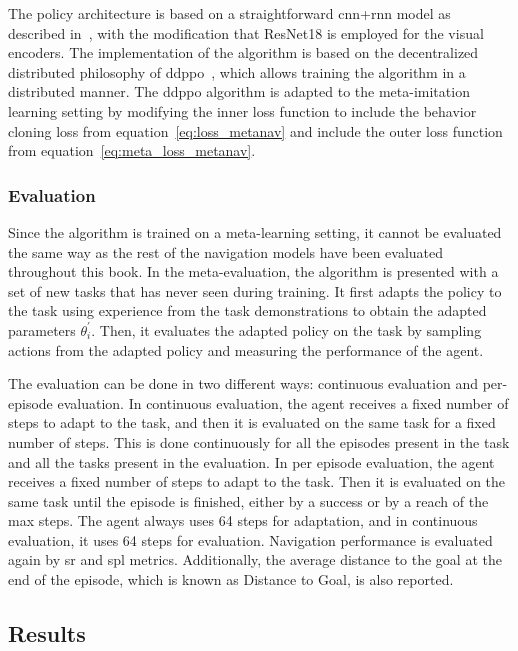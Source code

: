 The policy architecture is based on a straightforward \acrshort{cnn}+\acrshort{rnn} model as described in~\cite{ramrakhya2023}, with the modification that ResNet18 is employed for the visual encoders.
The implementation of the algorithm is based on the decentralized distributed philosophy of \acrshort{ddppo}~\cite{wijmans2020}, which allows training the algorithm in a distributed manner.
The \acrshort{ddppo} algorithm is adapted to the meta-imitation learning setting by modifying the inner loss function to include the behavior cloning loss from equation~\ref{eq:loss_metanav} and include the outer loss function from equation~\ref{eq:meta_loss_metanav}.

\subsubsection{Evaluation}\label{subsubsec:evaluation_metanav}

Since the algorithm is trained on a meta-learning setting, it cannot be evaluated the same way as the rest of the navigation models have been evaluated throughout this book.
In the meta-evaluation, the algorithm is presented with a set of new tasks that has never seen during training.
It first adapts the policy to the task using experience from the task demonstrations to obtain the adapted parameters $\theta^\prime_i$.
Then, it evaluates the adapted policy on the task by sampling actions from the adapted policy and measuring the performance of the agent.

The evaluation can be done in two different ways: continuous evaluation and per-episode evaluation.
In continuous evaluation, the agent receives a fixed number of steps to adapt to the task, and then it is evaluated on the same task for a fixed number of steps.
This is done continuously for all the episodes present in the task and all the tasks present in the evaluation.
In per episode evaluation, the agent receives a fixed number of steps to adapt to the task.
Then it is evaluated on the same task until the episode is finished, either by a success or by a reach of the max steps.
The agent always uses 64 steps for adaptation, and in continuous evaluation, it uses 64 steps for evaluation.
Navigation performance is evaluated again by \acrshort{sr} and \acrshort{spl} metrics.
Additionally, the average distance to the goal at the end of the episode, which is known as Distance to Goal, is also reported.

\subsection{Results}\label{subsec:results_metanav}

